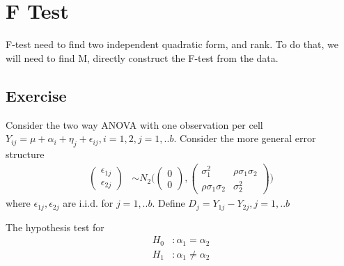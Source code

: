\section{F Test}

F-test need to find two independent quadratic form, and rank. To do that, we will need to find M, directly construct the F-test from the data.


\subsection{Exercise}

 Consider the two way ANOVA with one observation per cell $Y_{ij} = \mu + \alpha_i + \eta_j + \epsilon_{ij}, i=1,2, j=1,..b$. 
 Consider the more general error structure
  \begin{align*}
  \begin{pmatrix} \epsilon_{1j} \\  \epsilon_{2j} \end{pmatrix}  & \sim N_2 \Big( \begin{pmatrix} 0 \\ 0 \end{pmatrix}  ,   \begin{pmatrix} \sigma_1^2 & \rho \sigma_1 \sigma_2 \\ \rho \sigma_1 \sigma_2 &  \sigma_2^2  \end{pmatrix}  \Big) 
 \end{align*}
 where $\epsilon_{1j}, \epsilon_{2j}$ are i.i.d. for $j=1,..b$. Define $D_{j} = Y_{1j} - Y_{2j}, j=1,..b$
 
 The hypothesis test for 
 \begin{align*}
 H_0 &: \alpha_1 = \alpha_2 \\
 H_1 &: \alpha_1 \neq \alpha_2
 \end{align*}
 
